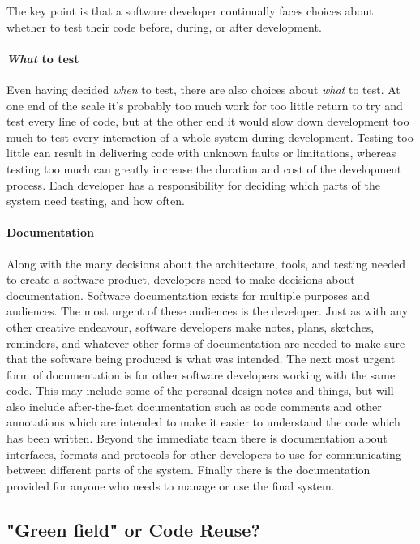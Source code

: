 The key point is that a software developer continually faces choices about whether to test their code before, during, or after development.

\paragraph{\emph{What} to test}

Even having decided \emph{when} to test, there are also choices about \emph{what} to test. At one end of the scale it's probably too much work for too little return to try and test every line of code, but at the other end it would slow down development too much to test every interaction of a whole system during development. Testing too little can result in delivering code with unknown faults or limitations, whereas testing too much can greatly increase the duration and cost of the development process. Each developer has a responsibility for deciding which parts of the system need testing, and how often.

\paragraph{Documentation}

Along with the many decisions about the architecture, tools, and testing needed to create a software product, developers need to make decisions about documentation. Software documentation exists for multiple purposes and audiences. The most urgent of these audiences is the developer. Just as with any other creative endeavour, software developers make notes, plans, sketches, reminders, and whatever other forms of documentation are needed to make sure that the software being produced is what was intended. The next most urgent form of documentation is for other software developers working with the same code. This may include some of the personal design notes and things, but will also include after-the-fact documentation such as code comments and other annotations which are intended to make it easier to understand the code which has been written. Beyond the immediate team there is documentation about interfaces, formats and protocols for other developers to use for communicating between different parts of the system. Finally there is the documentation provided for anyone who needs to manage or use the final system.

\subsection{"Green field" or Code Reuse?}

